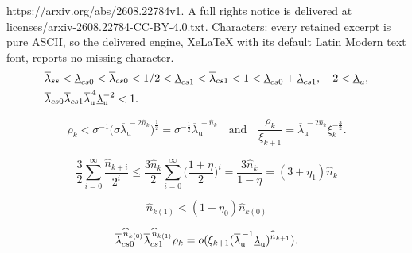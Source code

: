 \documentclass[10pt,a4paper]{amsart}
\def\ol{\overline}
\def\ru{{\mathrm{u}}}
\def\ul{\underline}
\def\wh{\widehat}
\begin{document}
https://arxiv.org/abs/2608.22784v1. A full rights notice is delivered at licenses/arxiv-2608.22784-CC-BY-4.0.txt. Characters: every retained excerpt is pure ASCII, so the delivered engine, XeLaTeX with its default Latin Modern text font, reports no missing character.
\begin{equation}\label{eqn_eigen_v2}
\begin{split}
&\overline{\lambda}_{\rm ss}<\ul\lambda_{\rm cs0}<\ol\lambda_{\rm cs0}<1/2<\underline\lambda_{\rm cs1}<\ol\lambda_{\rm cs1}<1<\underline\lambda_{\rm cs0}+\underline\lambda_{\rm cs1},\quad 2<\underline\lambda_{\rm u},\\
&\ol\lambda_{\rm cs0}\ol\lambda_{\rm cs1}\ol\lambda_{\ru}^{\,4}\ul\lambda_{\ru}^{-2}<1.
\end{split}
\end{equation}

\begin{equation}\label{eqn_xi_zeta3}
\rho_k<\sigma^{-1}\bigl(\sigma\ol\lambda_{\ru}^{\,-2\wh n_k}\bigr)^\frac12
=\sigma^{-\frac12}\ol\lambda_{\ru}^{\,-\wh n_k}
\quad\text{and}\quad 
\frac{\rho_k}{\xi_{k+1}}=\ol\lambda_{\ru}^{\, -2\wh n_k}\xi_k^{-\frac32}.
\end{equation}

\begin{equation}\label{eqn_3/2}
\frac{3}{2}\sum_{i=0}^{\infty}\frac{\widehat n_{k+i}}{2^{i}}
\leq 
\frac{3\widehat n_{k}}{2}\sum_{i=0}^{\infty}
\biggl(\frac{1+\eta}{2}\biggr)^{i}
=\frac{3\widehat n_{k}}{1-\eta}=(3+\eta_{1})\widehat n_{k}
\end{equation}

\begin{equation}\label{eqn_nk1_nk2}
\wh n_{k(1)}<(1+\eta_0)\wh n_{k(0)}
\end{equation}

\begin{lem}\label{lem7.3}
$$
\ol\lambda_{\rm cs0}^{\,\widehat n_{k(0)}}\ol\lambda_{\rm cs1}^{\,\widehat n_{k(1)}}\rho_{k}=o(\xi_{k+1}(\ol\lambda_{\ru}^{\,-1}\ul\lambda_{\ru})^{\wh n_{k+1}}).
$$
\end{lem}
\end{document}
